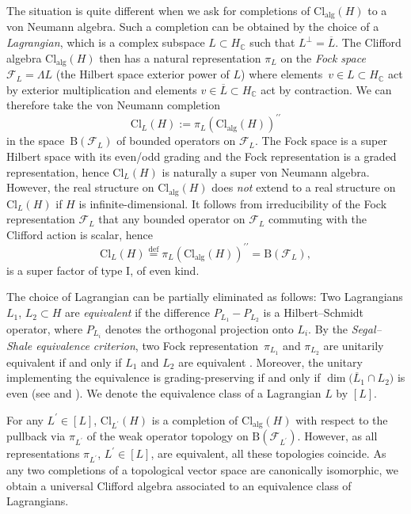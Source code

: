 \documentclass[10pt,a4paper]{amsart}
\numberwithin{equation}{section}
\newcommand{\C}{\mathbb{C}}
\newcommand{\B}{\mathrm{B}}
\newcommand{\Cl}{\mathrm{Cl}}
\begin{document}
The situation is quite different when we ask for completions of $\Cl_{\mathrm{alg}}(H)$ to a von Neumann algebra.
Such a completion can be obtained by the choice of a \emph{Lagrangian}, which is a complex subspace $L \subset H_\C$ such that $L^\perp = \overline{L}$.
The Clifford algebra $\Cl_{\mathrm{alg}}(H)$ then has a natural representation $\pi_L$ on the \emph{Fock space} $\mathcal{F}_L = \Lambda L$ (the Hilbert space exterior power of $L$) where elements~$v \in L \subset H_\C$ act by exterior multiplication and elements $v \in \overline{L} \subset H_\C$ act by contraction. We can therefore take the von Neumann completion
\[\Cl_L(H) := \pi_L(\Cl_{\mathrm{alg}}(H))^{\prime\prime}\]
 in the space~$\B(\mathcal{F}_L)$ of bounded operators on $\mathcal{F}_L$.
The Fock space is a super Hilbert space with its even/odd grading and the Fock representation is a graded representation, hence $\Cl_L(H)$ is naturally a super von Neumann algebra.
However, the real structure on $\Cl_{\mathrm{alg}}(H)$ does \emph{not} extend to a real structure on $\Cl_L(H)$ if $H$ is infinite-dimensional. It follows from irreducibility of the Fock representation $\mathcal{F}_L$ \cite[Theorem~2.4.2]{PlymenRobinson} that any bounded operator on $\mathcal{F}_L$ commuting with the Clifford action is scalar, hence
\begin{equation}
\label{IdentificationWithBH}
 \Cl_L(H)  \stackrel{\mathrm{def}}{=}  \pi_L(\Cl_{\mathrm{alg}}(H))^{\prime\prime} = \B(\mathcal{F}_L),
\end{equation}
is a super factor of type I, of even kind.

The choice of Lagrangian can be partially eliminated as follows:
Two Lagrangians $L_1$, $L_2 \subset H$ are \emph{equivalent} if the difference $P_{L_1} - P_{L_2}$ is a Hilbert--Schmidt operator, where $P_{L_i}$ denotes the orthogonal projection onto $L_i$.
By the \emph{Segal--Shale equivalence criterion}, two Fock representation~$\pi_{L_1}$ and $\pi_{L_2}$ are unitarily equivalent if and only if $L_1$ and $L_2$ are equivalent \cite[Theorem~3.4.1]{PlymenRobinson}.
Moreover, the unitary implementing the equivalence is grading-preserving if and only if $\dim\big(\overline{L}_1 \cap L_2\big)$ is even (see \cite[Theorem~1.22]{PratWaldron} and \cite[Theorem~3.5.1]{PlymenRobinson}).
We denote the equivalence class of a Lagrangian $L$ by $[L]$.

For any $L^\prime \in [L]$, $\Cl_{L^\prime}(H)$ is a completion of $\Cl_{\mathrm{alg}}(H)$ with respect to the pullback via $\pi_{L^\prime}$ of the weak operator topology on $\B(\mathcal{F}_{L^\prime})$.
However, as all representations $\pi_{L^\prime}$, $L^\prime \in [L]$, are equivalent, all these topologies coincide. As any two completions of a topological vector space are canonically isomorphic, we obtain a universal Clifford algebra associated to an equivalence class of Lagrangians.
\end{document}
